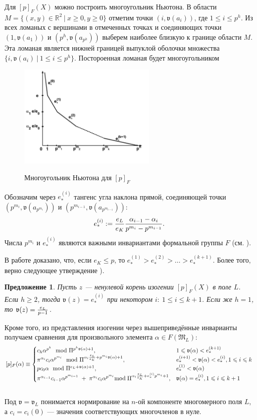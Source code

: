 \documentclass[a4paper]{article}
\newcommand{\ML}{\mathfrak{M}_L}
\newcommand{\val}{\mathfrak{v}}
\newcommand{\Rb}{\mathbb{R}}
\newcommand{\Leq}{\leqslant}
\newcommand{\Geq}{\geqslant}
\newtheorem{proposition}{Предложение}
\begin{document}
Для $[p]_F(X)$ можно построить многоугольник Ньютона. В области $M=\{(x,y)\in\Rb^2\ |\ x\Geq0,y\Geq0\}$ отметим точки $(i,\val(a_i))$, где $ 1\Leq i\Leq p^h$. Из всех ломаных с вершинами в отмеченных точках и соединяющих точки $(1,\val(a_1))$ и $(p^h,\val(a_{p^h}))$ выберем наиболее близкую к границе области $M$. Эта ломаная является нижней границей выпуклой оболочки множества $\{i,\val(a_i)\ |\ 1\Leq i\Leq p^h\}$. Постороенная ломаная будет многоугольником 
\begin{figure}[h]
	\centering	
	\includegraphics[height=5cm]{NewtonPolygon}
	\label{fig:Polygon}
	\caption{Многоугольник Ньютона для $[p]_F$}
\end{figure}

Обозначим через $e_*^{(i)}$ тангенс угла наклона прямой, соединяющей точки $(p^{m_i},\val(a_{p^{m_i}}))$ и $(p^{m_{i-1}},\val(a_{p^{m_{i-1}}}))$:
$$e_*^{(i)}:={e_L\over e_K}{\alpha_{i-1}-\alpha_{i}\over p^{m_i}-p^{m_{i-1}}}.$$
Числа $p^{m_i}$ и $e_*^{(i)}$ являются важными инвариантами формальной группы $F$ (см. \cite{book4}).

В работе \cite{book2} доказано, что, если $e_K \Leq p$, то $e_*^{(1)}>e_*^{(2)}>\dots>e_*^{(k+1)}$. Более того, верно следующее утверждение \cite[Лемма 2]{book2}).
\begin{proposition}
	Пусть $z$ --- ненулевой корень изогении $[p]_F(X)$ в поле $L$. Если $h \Geq 2$, тогда $\val(z)=e_*^{(i)}$ при некотором $i:\ 1\Leq i\Leq k+1$. Если же $h=1$, то $\val(z)={e_L\over p-1}$.
\end{proposition}

Кроме того, из представления изогении через вышеприведённые инварианты получаем сравнения для произвольного элемента $\alpha\in F(\ML)$:
$$[p]_F(\alpha)\equiv
\begin{cases}
c_h\alpha^{p^h}\mod\Pi^{p^h\val(\alpha)+1},& 1\Leq\val(\alpha)<e_*^{(k+1)} \cr
\pi^{\alpha_i}c_i\alpha^{p^{m_i}}\mod\Pi^{\alpha_i{e_L \over e_K}+p^{m_i}\val(\alpha)+1},&
e_*^{(i+1)}<\val(\alpha)<e_*^{(i)}, 1 \Leq i \Leq k \cr
pc_0\alpha\mod\Pi^{e_L+\val(\alpha)+1},& e_*^{(1)}<\val(\alpha) \cr  \pi^{\alpha_{i-1}}c_{i-1}\alpha^{p^{m_{i-1}}}\thickspace+\thickspace\pi^{\alpha_{i}}c_{i}\alpha^{p^{m_{i}}}\text{mod}\thickspace\Pi^{\alpha_{i}{e_L \over e_K}+e_*^{(i)}p^{m_{i}}+1}, 
& \val(\alpha)=e_*^{(i)}, 1\Leq i\Leq k+1 \cr
\end{cases}
$$\\
Под $\val=\val_L$ понимается нормирование на $n$-ой компоненте многомерного поля $L$, а $c_{i} = c_{i}(0)$ --- значения соответствующих многочленов в нуле.
\end{document}
